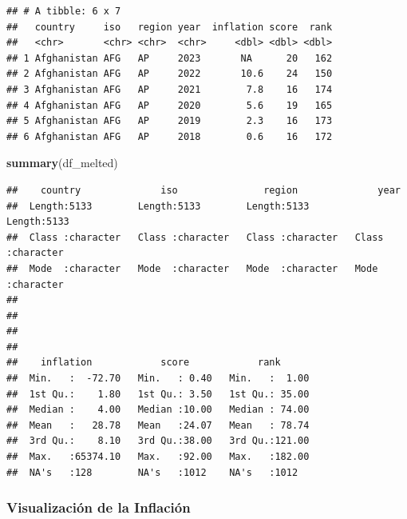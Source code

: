 \documentclass[
]{article}
\newenvironment{Shaded}{\begin{snugshade}}{\end{snugshade}}
\newcommand{\FunctionTok}[1]{\textcolor[rgb]{0.13,0.29,0.53}{\textbf{#1}}}
\newcommand{\NormalTok}[1]{#1}
\begin{document}
\begin{verbatim}
## # A tibble: 6 x 7
##   country     iso   region year  inflation score  rank
##   <chr>       <chr> <chr>  <chr>     <dbl> <dbl> <dbl>
## 1 Afghanistan AFG   AP     2023       NA      20   162
## 2 Afghanistan AFG   AP     2022       10.6    24   150
## 3 Afghanistan AFG   AP     2021        7.8    16   174
## 4 Afghanistan AFG   AP     2020        5.6    19   165
## 5 Afghanistan AFG   AP     2019        2.3    16   173
## 6 Afghanistan AFG   AP     2018        0.6    16   172
\end{verbatim}

\begin{Shaded}
\begin{Highlighting}[]
\FunctionTok{summary}\NormalTok{(df\_melted)}
\end{Highlighting}
\end{Shaded}

\begin{verbatim}
##    country              iso               region              year          
##  Length:5133        Length:5133        Length:5133        Length:5133       
##  Class :character   Class :character   Class :character   Class :character  
##  Mode  :character   Mode  :character   Mode  :character   Mode  :character  
##                                                                             
##                                                                             
##                                                                             
##                                                                             
##    inflation            score            rank       
##  Min.   :  -72.70   Min.   : 0.40   Min.   :  1.00  
##  1st Qu.:    1.80   1st Qu.: 3.50   1st Qu.: 35.00  
##  Median :    4.00   Median :10.00   Median : 74.00  
##  Mean   :   28.78   Mean   :24.07   Mean   : 78.74  
##  3rd Qu.:    8.10   3rd Qu.:38.00   3rd Qu.:121.00  
##  Max.   :65374.10   Max.   :92.00   Max.   :182.00  
##  NA's   :128        NA's   :1012    NA's   :1012
\end{verbatim}

\subsubsection{Visualización de la
Inflación}\label{visualizacion-de-la-inflacion}
\end{document}
